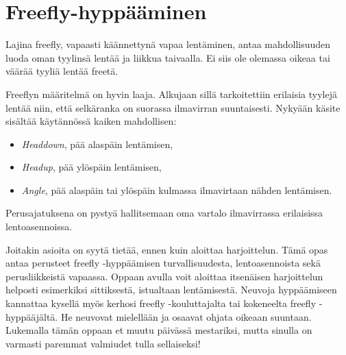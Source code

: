 \section{ Freefly-hyppääminen }
\label{johdanto-freehyppaamiseen-freefly-hyppaaminen}


Lajina freefly, vapaasti käännettynä vapaa lentäminen, antaa mahdollisuuden luoda oman tyylinsä lentää ja liikkua taivaalla. Ei siis ole olemassa oikeaa tai väärää tyyliä lentää freetä. 


Freeflyn määritelmä on hyvin laaja.  Alkujaan sillä tarkoitettiin erilaisia tyylejä lentää niin, että selkäranka on suorassa ilmavirran suuntaisesti. Nykyään käsite sisältää käytännössä kaiken mahdollisen:  

\begin{itemize}
\item  \textit{Headdown}, pää alaspäin lentämisen, 
\item  \textit{Headup}, pää ylöspäin lentämisen, 
\item  \textit{Angle}, pää alaspäin tai ylöspäin kulmassa ilmavirtaan nähden lentämisen. 
\end{itemize}

Perusajatuksena on pystyä hallitsemaan oma vartalo ilmavirrassa erilaisissa lentoasennoissa. 


Joitakin asioita on syytä tietää, ennen kuin aloittaa harjoittelun. Tämä opas antaa perusteet freefly -hyppäämisen turvallisuudesta, lentoasennoista sekä perusliikkeistä vapaassa. Oppaan avulla voit aloittaa itsenäisen harjoittelun helposti esimerkiksi sittiksestä, istualtaan lentämisestä. Neuvoja hyppäämiseen kannattaa kysellä myös kerhosi freefly -kouluttajalta tai kokeneelta freefly -hyppääjältä. He neuvovat mielellään ja osaavat ohjata oikeaan suuntaan. Lukemalla tämän oppaan et muutu päivässä mestariksi, mutta sinulla on varmasti paremmat valmiudet tulla sellaiseksi! 

